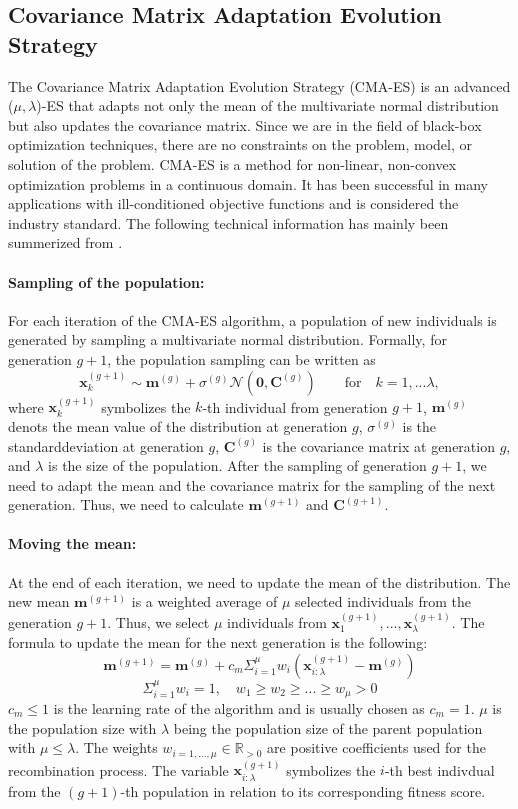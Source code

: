 \subsection{Covariance Matrix Adaptation Evolution Strategy}
The Covariance Matrix Adaptation Evolution Strategy (CMA-ES) is an advanced ($\mu, \lambda$)-ES that adapts not only the mean of the multivariate normal distribution but also updates the covariance matrix. Since we are in the field of black-box optimization techniques, there are no constraints on the problem, model, or solution of the problem. CMA-ES is a method for non-linear, non-convex optimization problems in a continuous domain. It has been successful in many applications with ill-conditioned objective functions and is considered the industry standard. The following technical information has mainly been summerized from \cite{hansen2016cma}.

\paragraph*{Sampling of the population:} For each iteration of the CMA-ES algorithm, a population of new individuals is generated by sampling a multivariate normal distribution. Formally, for generation $g+1$, the population sampling can be written as
\[
  \mathbf{x}_k^{(g+1)} \sim \mathbf{m}^{(g)} + \sigma^{(g)}  \mathcal{N}(\mathbf{0}, \mathbf{C}^{(g)}) \qquad \text{for} \quad k = 1, ... \lambda,
\]
where $\mathbf{x}_k^{(g+1)}$ symbolizes the $k$-th individual from generation $g+1$, $\mathbf{m}^{(g)}$ denots the mean value of the distribution at generation $g$, $\sigma^{(g)}$ is the standarddeviation at generation $g$, $\mathbf{C}^{(g)}$ is the covariance matrix at generation $g$, and $\lambda$ is the size of the population. After the sampling of generation $g+1$, we need to adapt the mean and the covariance matrix for the sampling of the next generation. Thus, we need to calculate $\mathbf{m}^{(g+1)}$ and $\mathbf{C}^{(g+1)}$.

\paragraph*{Moving the mean:} At the end of each iteration, we need to update the mean of the distribution. The new mean $\mathbf{m}^{(g+1)}$ is a weighted average of $\mu$ selected individuals from the generation $g+1$. Thus, we select $\mu$ individuals from $\mathbf{x}_1^{(g+1)}, ..., \mathbf{x}_\lambda^{(g+1)}$. The formula to update the mean for the next generation is the following:
\[
  \mathbf{m}^{(g+1)} = \mathbf{m}^{(g)} + c_m \Sigma^\mu_{i=1} w_i (\mathbf{x}_{i:\lambda}^{(g+1)} - \mathbf{m}^{(g)})
\]
\[
  \Sigma^\mu_{i=1} w_i = 1, \quad w_1 \geq w_2 \geq ... \geq w_\mu > 0
\]
$c_m \leq 1$ is the learning rate of the algorithm and is usually chosen as $c_m = 1$. $\mu$ is the population size with $\lambda$ being the population size of the parent population with $\mu \leq \lambda$. The weights $w_{i=1,...,\mu} \in \mathbb{R}_{>0}$ are positive coefficients used for the recombination process. The variable $\mathbf{x}_{i:\lambda}^{(g+1)}$ symbolizes the $i$-th best indivdual from the $(g+1)$-th population in relation to its corresponding fitness score.

